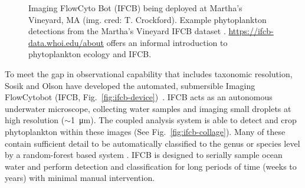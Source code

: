 \begin{figure}
\begin{center}

%
\end{center}
\caption{
\protect{} Imaging FlowCyto Bot (IFCB) being deployed at Martha's Vineyard, MA (img. cred: T. Crockford).
\protect{} Example phytoplankton detections from the Martha's Vineyard IFCB dataset \citep{SosikDataset}. \url{https://ifcb-data.whoi.edu/about} offers an informal introduction to phytoplankton ecology and IFCB.
}
\label{fig:ifcb}
\end{figure}

To meet the gap in observational capability that includes taxonomic resolution, Sosik and Olson have developed the automated, submersible Imaging FlowCytobot (IFCB, Fig.~\ref{fig:ifcb-device})~\citep{Olson2007a}. IFCB acts as an autonomous underwater microscope, collecting water samples and imaging small droplets at high resolution ($\sim$\SI{1}{\micro\meter}). The coupled analysis system \citep{Sosik2007} is able to detect and crop phytoplankton within these images (See Fig.~\ref{fig:ifcb-collage}). Many of these contain sufficient detail to be automatically classified to the genus or species level by a random-forest based system \citep{Sosik2016}. IFCB is designed to serially sample ocean water and perform detection and classification for long periods of time (weeks to years) with minimal manual intervention.

